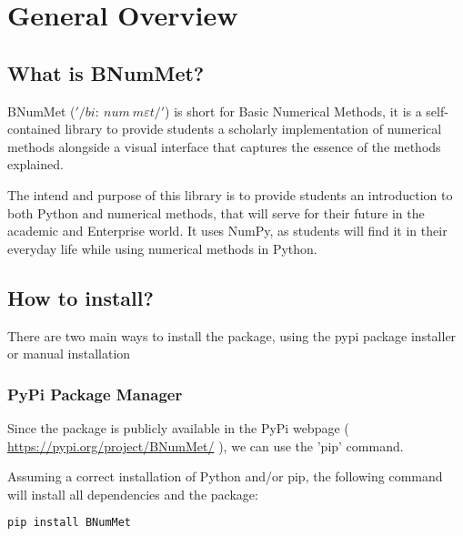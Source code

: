 \section{General Overview}
\subsection{What is BNumMet?}
BNumMet ($'/bi:\ num\ m\varepsilon t/'$) is short for Basic Numerical Methods, it is a self-contained library to provide students a scholarly implementation of numerical methods alongside a visual interface that captures the essence of the methods explained.

The intend and purpose of this library is to provide students an introduction to both Python and numerical methods, that will serve for their future in the academic and Enterprise world. It uses NumPy, as students will find it in their everyday life while using numerical methods in Python. 



\subsection{How to install?}
There are two main ways to install the package, using the pypi package installer or manual installation
\subsubsection{PyPi Package Manager}
Since the package is publicly available in the PyPi webpage ( \href{https://pypi.org/project/BNumMet/}{https://pypi.org/project/BNumMet/} ), we can use the 'pip' command.

Assuming a correct installation of Python and/or pip, the following command will install all dependencies and the package:
\begin{lstlisting}[language=Python]
pip install BNumMet
\end{lstlisting}

